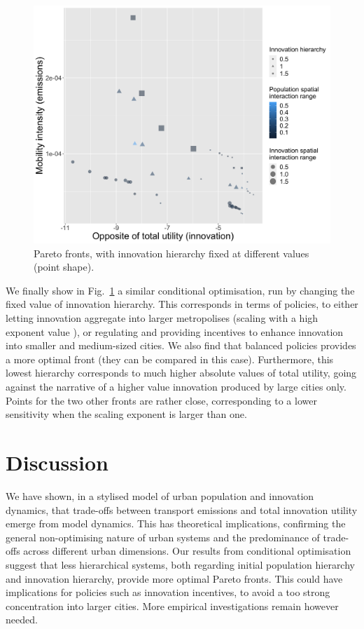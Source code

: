 \documentclass[final,5p,times,twocolumn,authoryear]{elsarticle}
\begin{document}
\begin{figure}
	\centering
	\includegraphics[width=\linewidth]{figures/pareto-oppAverageUtility-averageGravityFlow_VARYINGINNOVHIERARCHY_color-gravityDecay_size-innovationDecay.png}
	\caption{Pareto fronts, with innovation hierarchy fixed at different values (point shape).\label{fig:fig3}}
\end{figure}

We finally show in Fig.~\ref{fig:fig3} a similar conditional optimisation, run by changing the fixed value of innovation hierarchy. This corresponds in terms of policies, to either letting innovation aggregate into larger metropolises (scaling with a high exponent value \cite{pumain2006evolutionary}), or regulating and providing incentives to enhance innovation into smaller and medium-sized cities. We also find that balanced policies provides a more optimal front (they can be compared in this case). Furthermore, this lowest hierarchy corresponds to much higher absolute values of total utility, going against the narrative of a higher value innovation produced by large cities only. Points for the two other fronts are rather close, corresponding to a lower sensitivity when the scaling exponent is larger than one.




\section{Discussion}

We have shown, in a stylised model of urban population and innovation dynamics, that trade-offs between transport emissions and total innovation utility emerge from model dynamics. This has theoretical implications, confirming the general non-optimising nature of urban systems and the predominance of trade-offs across different urban dimensions. Our results from conditional optimisation suggest that less hierarchical systems, both regarding initial population hierarchy and innovation hierarchy, provide more optimal Pareto fronts. This could have implications for policies such as innovation incentives, to avoid a too strong concentration into larger cities. More empirical investigations remain however needed.
\end{document}
